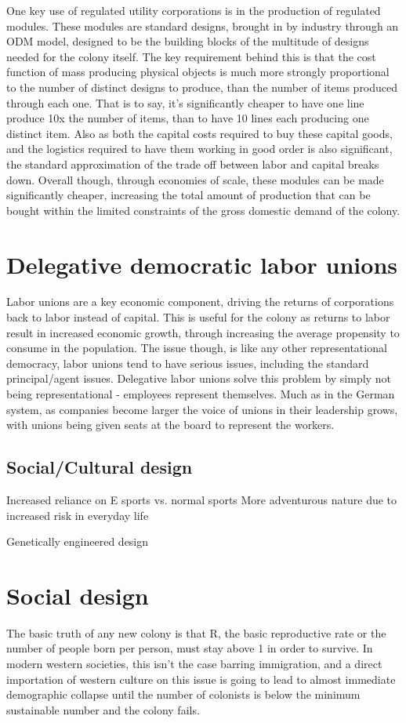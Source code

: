 \documentclass[10pt]{article}
\begin{document}
One key use of regulated utility corporations is in the production of regulated modules. These modules are standard designs, brought in by industry through an ODM model, designed to be the building blocks of the multitude of designs needed for the colony itself. The key requirement behind this is that the cost function of mass producing physical objects is much more strongly proportional to the number of distinct designs to produce, than the number of items produced through each one. That is to say, it's significantly cheaper to have one line produce 10x the number of items, than to have 10 lines each producing one distinct item. Also as both the capital costs required to buy these capital goods, and the logistics required to have them working in good order is also significant, the standard approximation of the trade off between labor and capital breaks down. Overall though, through economies of scale, these modules can be made significantly cheaper, increasing the total amount of production that can be bought within the limited constraints of the gross domestic demand of the colony.

\section{Delegative democratic labor unions}
Labor unions are a key economic component, driving the returns of corporations back to labor instead of capital. This is useful for the colony as returns to labor result in increased economic growth, through increasing the average propensity to consume in the population. The issue though, is like any other representational democracy, labor unions tend to have serious issues, including the standard principal/agent issues. Delegative labor unions solve this problem by simply not being representational - employees represent themselves. Much as in the German system, as companies become larger the voice of unions in their leadership grows, with unions being given seats at the board to represent the workers.

\subsection*{Social/Cultural design}
Increased reliance on E sports vs. normal sports
More adventurous nature due to increased risk in everyday life

Genetically engineered design

\section{Social design}
The basic truth of any new colony is that R, the basic reproductive rate or the number of people born per person, must stay above 1 in order to survive. In modern western societies, this isn't the case barring immigration, and a direct importation of western culture on this issue is going to lead to almost immediate demographic collapse until the number of colonists is below the minimum sustainable number and the colony fails.
\end{document}
